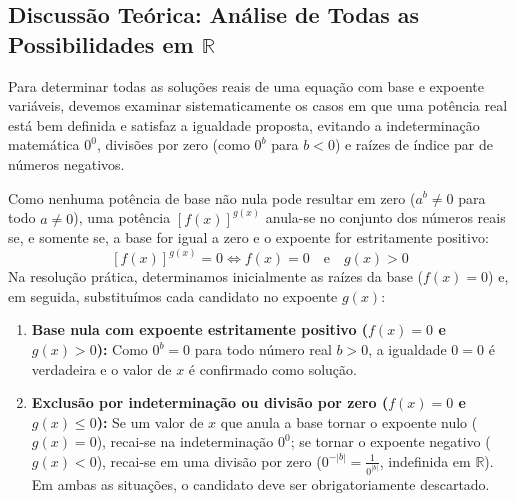 \documentclass[12pt,a4paper]{report}
\begin{document}
	\subsection*{Discussão Teórica: Análise de Todas as Possibilidades em $\mathbb{R}$}
	
	Para determinar todas as soluções reais de uma equação com base e expoente variáveis, devemos examinar sistematicamente os casos em que uma potência real está bem definida e satisfaz a igualdade proposta, evitando a indeterminação matemática $0^0$, divisões por zero (como $0^b$ para $b < 0$) e raízes de índice par de números negativos.
	
	\begin{destaque}[{Caso I: Equações da forma $[f(x)]^{g(x)} = 0$}]
		Como nenhuma potência de base não nula pode resultar em zero ($a^b \neq 0$ para todo $a \neq 0$), uma potência $[f(x)]^{g(x)}$ anula-se no conjunto dos números reais se, e somente se, a base for igual a zero e o expoente for estritamente positivo:
		\[
		[f(x)]^{g(x)} = 0 \iff f(x) = 0 \quad \text{e} \quad g(x) > 0
		\]
		Na resolução prática, determinamos inicialmente as raízes da base ($f(x) = 0$) e, em seguida, substituímos cada candidato no expoente $g(x)$:
		\begin{enumerate}
			\item \textbf{Base nula com expoente estritamente positivo ($f(x) = 0$ e $g(x) > 0$):}
			Como $0^b = 0$ para todo número real $b > 0$, a igualdade $0 = 0$ é verdadeira e o valor de $x$ é confirmado como solução.
			\item \textbf{Exclusão por indeterminação ou divisão por zero ($f(x) = 0$ e $g(x) \leqslant 0$):}
			Se um valor de $x$ que anula a base tornar o expoente nulo ($g(x) = 0$), recai-se na indeterminação $0^0$; se tornar o expoente negativo ($g(x) < 0$), recai-se em uma divisão por zero ($0^{-|b|} = \frac{1}{0^{|b|}}$, indefinida em $\mathbb{R}$). Em ambas as situações, o candidato deve ser obrigatoriamente descartado.
		\end{enumerate}
	\end{destaque}
	
	\vspace{0.3cm}
	
\end{document}
